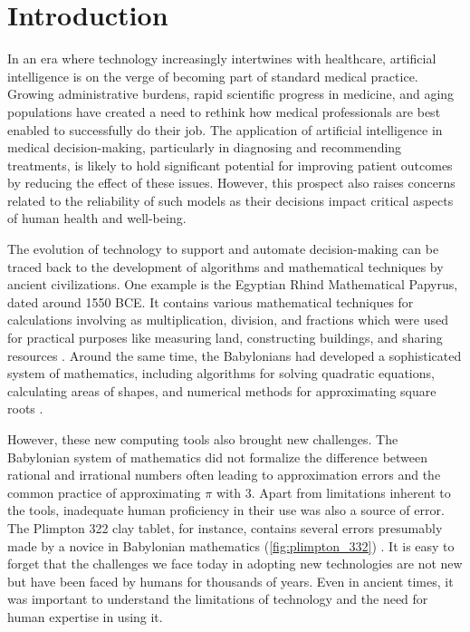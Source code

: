 
\chapter[introduction]{Introduction}\label{chp:introduction}
%

In an era where technology increasingly intertwines with healthcare, artificial intelligence is on the verge of becoming part of standard medical practice. 
Growing administrative burdens, rapid scientific progress in medicine, and aging populations have created a need to rethink how medical professionals are best enabled to successfully do their job. 
The application of artificial intelligence in medical decision-making, particularly in diagnosing and recommending treatments, is likely to hold significant potential for improving patient outcomes by reducing the effect of these issues. 
However, this prospect also raises concerns related to the reliability of such models as their decisions impact critical aspects of human health and well-being.

The evolution of technology to support and automate decision-making can be traced back to the development of algorithms and mathematical techniques by ancient civilizations. 
One example is the Egyptian Rhind Mathematical Papyrus, dated around 1550 BCE. It contains various mathematical techniques for calculations involving as multiplication, division, and fractions which were used for practical purposes like measuring land, constructing buildings, and sharing resources \cite{georges_universal_2001}. 
Around the same time, the Babylonians had developed a sophisticated system of mathematics, including algorithms for solving quadratic equations, calculating areas of shapes, and numerical methods for approximating square roots \cite{fowler_square_1998}. 

However, these new computing tools also brought new challenges. The Babylonian system of mathematics did not formalize the difference between rational and irrational numbers often leading to approximation errors and the common practice of approximating $\pi$ with 3. Apart from limitations inherent to the tools, inadequate human proficiency in their use was also a source of error. The Plimpton 322 clay tablet, for instance, contains several errors presumably made by a novice in Babylonian mathematics (\cref{fig:plimpton_332}) \cite{britton_plimpton_2011}. 
It is easy to forget that the challenges we face today in adopting new technologies are not new but have been faced by humans for thousands of years. Even in ancient times, it was important to understand the limitations of technology and the need for human expertise in using it.

